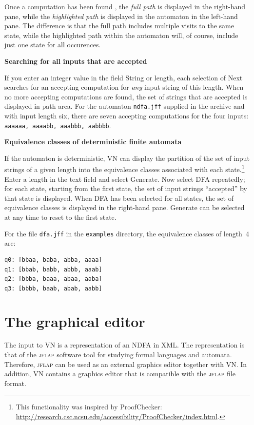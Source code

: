 \documentclass[11pt]{article}
\newcommand{\vn}{\textsc{VN}}
\newcommand{\jf}{\textsc{jflap}}
\newcommand{\p}[1]{\texttt{#1}}
\newcommand{\bu}[1]{\textsf{#1}}
\begin{document}
Once a computation has been found , the \emph{full path} is displayed in
the right-hand pane, while the \emph{highlighted path} is displayed in
the automaton in the left-hand pane. The difference is that the full
path includes multiple visits to the same state, while the highlighted
path within the automaton will, of course, include just one state for
all occurences.

\noindent\textbf{Searching for all inputs that are accepted}

If you enter an integer value in the field \bu{String or length}, each
selection of \bu{Next} searches for an accepting computation for
\emph{any} input string of this length. When no more accepting
computations are found, the set of strings that are accepted is
displayed in path area. For the automaton \p{ndfa.jff} supplied in the
archive and with input length six, there are seven accepting
computations for the four inputs: \p{aaaaaa, aaaabb, aaabbb, aabbbb}.

\noindent\textbf{Equivalence classes of deterministic finite automata}

If the automaton is deterministic, \vn{} can display the partition of
the set of input strings of a given length into the equivalence classes
associated with each state.\footnote{This functionality was inspired by
\bu{ProofChecker}:\\
\hspace*{2cm}\url{http://research.csc.ncsu.edu/accessibility/ProofChecker/index.html}.}
Enter a length in the text field and select \bu{Generate}. Now select
\bu{DFA} repeatedly; for each state, starting from the first state, the
set of input strings ``accepted'' by that state is displayed. When
\bu{DFA} has been selected for all states, the set of equivalence
classes is displayed in the right-hand pane. \bu{Generate} can
be selected at any time to reset to the first state.

For the file \p{dfa.jff} in the \p{examples} directory, the equivalence classes
of length~$4$ are:
\begin{verbatim}
q0: [bbaa, baba, abba, aaaa]
q1: [bbab, babb, abbb, aaab]
q2: [bbba, baaa, abaa, aaba]
q3: [bbbb, baab, abab, aabb]
\end{verbatim}

\section{The graphical editor}

The input to \vn{} is a representation of an NDFA in \textsc{XML}. The
representation is that of the \jf{} software tool for studying formal
languages and automata. Therefore, \jf{} can be used as an external
graphics editor together with \vn{}. In addition, \vn{} contains a
graphics editor that is compatible with the \jf{} file format.
\end{document}
